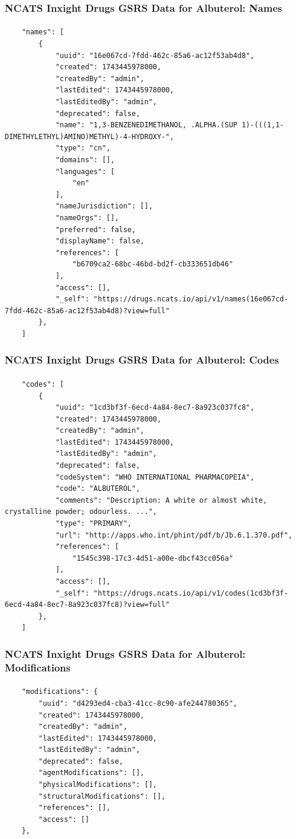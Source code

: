 \documentclass[aspectratio=169,xcolor=dvipsnames]{beamer}
\begin{document}
\begin{frame}[fragile,t]
  \frametitle{NCATS Inxight Drugs GSRS Data for Albuterol: Names}
  \framesubtitle{}
  \tiny
\begin{verbatim}
    "names": [
        {
            "uuid": "16e067cd-7fdd-462c-85a6-ac12f53ab4d8",
            "created": 1743445978000,
            "createdBy": "admin",
            "lastEdited": 1743445978000,
            "lastEditedBy": "admin",
            "deprecated": false,
            "name": "1,3-BENZENEDIMETHANOL, .ALPHA.(SUP 1)-(((1,1-DIMETHYLETHYL)AMINO)METHYL)-4-HYDROXY-",
            "type": "cn",
            "domains": [],
            "languages": [
                "en"
            ],
            "nameJurisdiction": [],
            "nameOrgs": [],
            "preferred": false,
            "displayName": false,
            "references": [
                "b6709ca2-68bc-46bd-bd2f-cb333651db46"
            ],
            "access": [],
            "_self": "https://drugs.ncats.io/api/v1/names(16e067cd-7fdd-462c-85a6-ac12f53ab4d8)?view=full"
        },
    ]
\end{verbatim}
\end{frame}

\begin{frame}[fragile,t]
  \frametitle{NCATS Inxight Drugs GSRS Data for Albuterol: Codes}
  \framesubtitle{}
  \tiny
\begin{verbatim}
    "codes": [
        {
            "uuid": "1cd3bf3f-6ecd-4a84-8ec7-8a923c037fc8",
            "created": 1743445978000,
            "createdBy": "admin",
            "lastEdited": 1743445978000,
            "lastEditedBy": "admin",
            "deprecated": false,
            "codeSystem": "WHO INTERNATIONAL PHARMACOPEIA",
            "code": "ALBUTEROL",
            "comments": "Description: A white or almost white, crystalline powder; odourless. ...",
            "type": "PRIMARY",
            "url": "http://apps.who.int/phint/pdf/b/Jb.6.1.370.pdf",
            "references": [
                "1545c398-17c3-4d51-a00e-dbcf43cc056a"
            ],
            "access": [],
            "_self": "https://drugs.ncats.io/api/v1/codes(1cd3bf3f-6ecd-4a84-8ec7-8a923c037fc8)?view=full"
        },
    ]
\end{verbatim}
\end{frame}

\begin{frame}[fragile,t]
  \frametitle{NCATS Inxight Drugs GSRS Data for Albuterol: Modifications}
  \framesubtitle{}
  \tiny
\begin{verbatim}
    "modifications": {
        "uuid": "d4293ed4-cba3-41cc-8c90-afe244780365",
        "created": 1743445978000,
        "createdBy": "admin",
        "lastEdited": 1743445978000,
        "lastEditedBy": "admin",
        "deprecated": false,
        "agentModifications": [],
        "physicalModifications": [],
        "structuralModifications": [],
        "references": [],
        "access": []
    },
\end{verbatim}
\end{frame}
\end{document}
